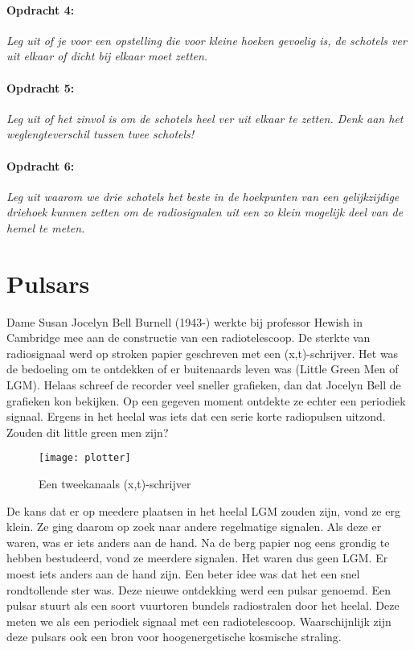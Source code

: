 \paragraph*{Opdracht 4:}

\emph{Leg uit of je voor een opstelling die voor kleine hoeken gevoelig
is, de schotels ver uit elkaar of dicht bij elkaar moet zetten.}


\paragraph*{Opdracht 5:}

\emph{Leg uit of het zinvol is om de schotels heel ver uit elkaar
te zetten. Denk aan het weglengteverschil tussen twee schotels!}


\paragraph*{Opdracht 6:}

\emph{Leg uit waarom we drie schotels het beste in de hoekpunten van
een gelijkzijdige driehoek kunnen zetten om de radiosignalen uit een
zo klein mogelijk deel van de hemel te meten.}


\section{Pulsars}

Dame Susan Jocelyn Bell Burnell (1943-) werkte bij professor Hewish
in Cambridge mee aan de constructie van een radiotelescoop. De sterkte
van radiosignaal werd op stroken papier geschreven met een (x,t)-schrijver.
Het was de bedoeling om te ontdekken of er buitenaards leven was (Little
Green Men of LGM). Helaas schreef de recorder veel sneller grafieken,
dan dat Jocelyn Bell de grafieken kon bekijken. Op een gegeven moment
ontdekte ze echter een periodiek signaal. Ergens in het heelal was
iets dat een serie korte radiopulsen uitzond. Zouden dit little green
men zijn?

\begin{figure}[H]
\noindent \begin{centering}
\texttt{[image: plotter]}
\par\end{centering}

\caption{Een tweekanaals (x,t)-schrijver}
\end{figure}


De kans dat er op meedere plaatsen in het heelal LGM zouden zijn,
vond ze erg klein. Ze ging daarom op zoek naar andere regelmatige
signalen. Als deze er waren, was er iets anders aan de hand. Na de
berg papier nog eens grondig te hebben bestudeerd, vond ze meerdere
signalen. Het waren dus geen LGM. Er moest iets anders aan de hand
zijn. Een beter idee was dat het een snel rondtollende ster was. Deze
nieuwe ontdekking werd een pulsar genoemd. Een pulsar stuurt als een
soort vuurtoren bundels radiostralen door het heelal. Deze meten we
als een periodiek signaal met een radiotelescoop. Waarschijnlijk zijn
deze pulsars ook een bron voor hoogenergetische kosmische straling. 


